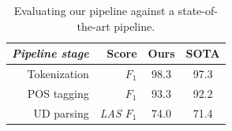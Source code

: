 \documentclass[11pt,a4paper]{article}
\begin{document}
%




\begin{table}[t]
	\centering
	\begin{tabular}{rrcc}
		\it Pipeline stage & Score & Ours & SOTA \\
		\hline
		Tokenization  & \it $F_1$ & 98.3 & 97.3 \\		
		POS tagging &  \it  $F_1$ & 93.3 & 92.2 \\
		UD parsing & \it LAS $F_1$ & 74.0 & 71.4 \\
	\end{tabular}
	\caption{Evaluating our pipeline against a state-of-the-art pipeline.\label{tbl:pipline} %
	}
\end{table}
\end{document}
